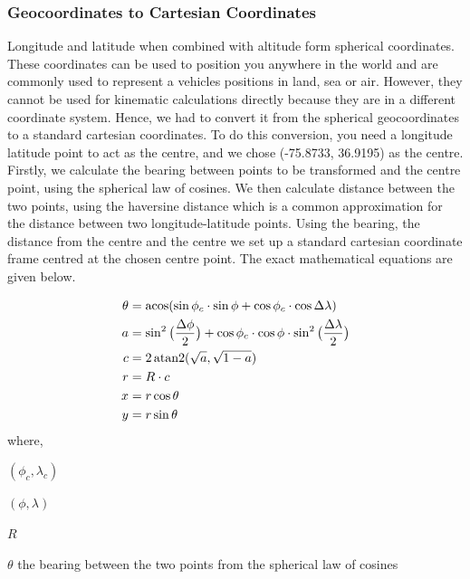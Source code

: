 \documentclass[bsc,frontabs,twoside,singlespacing,parskip,deptreport]{infthesis}     %
\begin{document}
\subsubsection{Geocoordinates to Cartesian Coordinates}
\label{sss:geo}
Longitude and latitude when combined with altitude form spherical coordinates. These coordinates can be used to position you anywhere in the world and are commonly used to represent a vehicles positions in land, sea or air. However, they cannot be used for kinematic calculations directly because they are in a different coordinate system. Hence, we had to convert it from the spherical geocoordinates to a standard cartesian coordinates. To do this conversion, you need a longitude latitude point to act as the centre, and we chose (-75.8733, 36.9195) as the centre. Firstly, we calculate the bearing between points to be transformed and the centre point, using the spherical law of cosines. We then calculate distance between the two points, using the haversine distance which is a common approximation for the distance between two longitude-latitude points. Using the bearing, the distance from the centre and the centre we set up a standard cartesian coordinate frame centred at the chosen centre point. The exact mathematical equations are given below.

\begin{align*}
    \theta &= \operatorname{acos}(\sin\phi_c \cdot \sin\phi + \cos\phi_c \cdot \cos\Delta\lambda) \\
    a &= \sin^2\big(\frac{\Delta\phi}{2}\big) + \cos \phi_c \cdot \cos \phi \cdot \sin^2\big(\frac{\Delta\lambda}{2}\big) \\
    c &= 2 \operatorname{atan2}(\sqrt{a}, \sqrt{1-a}) \\
    r &= R\cdot c \\
    x &= r\cos{\theta} \\
    y &= r\sin{\theta} \\
\end{align*}
where,

\hspace{0.25in} $(\phi_c, \lambda_c)$ 

\hspace{0.25in} $(\phi, \lambda)$ 

\hspace{0.25in} $R$ 

\hspace{0.25in} $\theta$ the bearing between the two points from the spherical law of cosines
\end{document}
